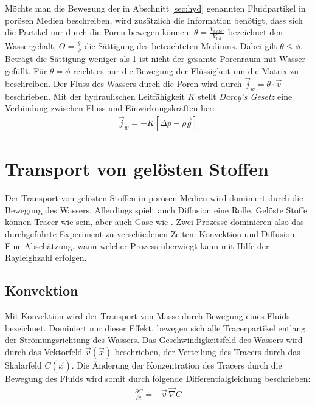 Möchte man die Bewegung der in Abschnitt \ref{sec:hyd} genannten Fluidpartikel in porösen Medien beschreiben, wird zusätzlich die Information benötigt, dass sich die Partikel nur durch die Poren bewegen können:
\mbox{$\theta = \frac{V_{water}}{V_{tot}}$} bezeichnet den Wassergehalt, $\Theta = \frac{\theta}{\phi}$ die Sättigung des betrachteten Mediums. 
Dabei gilt $\theta \leq \phi$. Beträgt die Sättigung weniger als 1 ist nicht der gesamte Porenraum mit Wasser gefüllt. Für $\theta = \phi$ reicht es nur die
Bewegung der Flüssigkeit um die Matrix zu beschreiben. Der Fluss des Wassers durch die Poren wird durch $\vec{j}_w = \theta \cdot \vec{v}$ beschrieben. 
Mit der hydraulischen Leitfähigkeit $K$ stellt \textit{Darcy's Gesetz} eine Verbindung zwischen Fluss und Einwirkungskräften her:
\begin{align}
 \vec{j}_w = -K \left[ \Delta p - \rho \vec{g} \right]
 \label{darcy}
\end{align}


\section{Transport von gelösten Stoffen}
\label{sec:soltra}

Der Transport von gelösten Stoffen in porösen Medien wird dominiert durch die Bewegung des Wassers. Allerdings spielt auch Diffusion eine Rolle. Gelöste Stoffe können Tracer wie \BCG sein, aber auch Gase wie \COTn.
Zwei Prozesse dominieren also das durchgeführte Experiment zu verschiedenen Zeiten: Konvektion und Diffusion. Eine Abschätzung, wann welcher Prozess überwiegt kann mit Hilfe der Rayleighzahl erfolgen.

\subsection{Konvektion}
\label{sec:conv}
Mit Konvektion wird der Transport von Masse durch Bewegung eines Fluids bezeichnet. Dominiert nur dieser Effekt, bewegen sich alle Tracerpartikel entlang der Strömungsrichtung des Wassers.
Das Geschwindigkeitsfeld des Wassers wird durch das Vektorfeld $\vec{v}(\vec{x})$ beschrieben, der Verteilung des Tracers durch das Skalarfeld $C(\vec{x})$. 
Die Änderung der Konzentration des Tracers durch die Bewegung des Fluids wird somit durch folgende Differentialgleichung beschrieben:
\begin{align}
 \frac{\partial C}{\partial t} = -\vec{v} \, \vec{\nabla}C
\end{align}


